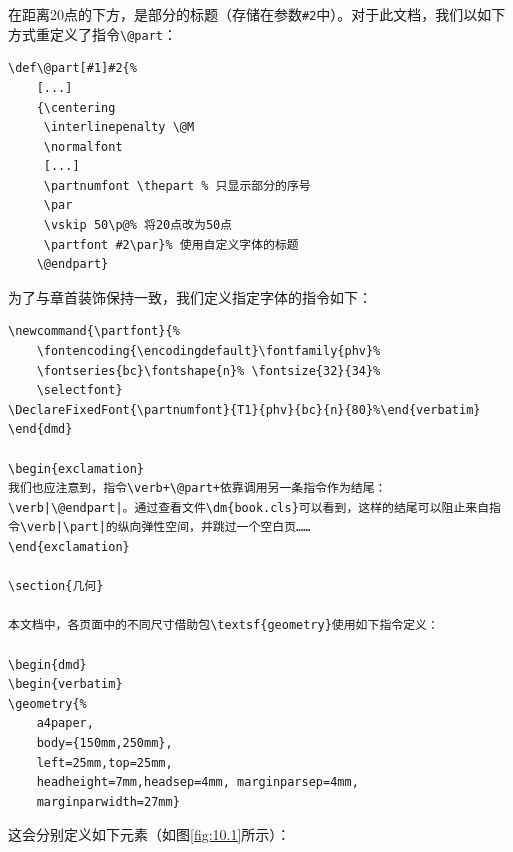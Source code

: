 在距离20点的下方，是部分的标题（存储在参数\verb|#2|中）。对于此文档，我们以如下方式重定义了指令\verb|\@part|：

\begin{dmd}
\begin{verbatim}
\def\@part[#1]#2{% 
    [...]
    {\centering
     \interlinepenalty \@M
     \normalfont
     [...]
     \partnumfont \thepart % 只显示部分的序号
     \par
     \vskip 50\p@% 将20点改为50点
     \partfont #2\par}% 使用自定义字体的标题
    \@endpart}\end{verbatim}
\end{dmd}

为了与章首装饰保持一致，我们定义指定字体的指令如下：

\begin{dmd}
\begin{verbatim}
\newcommand{\partfont}{% 
    \fontencoding{\encodingdefault}\fontfamily{phv}% 
    \fontseries{bc}\fontshape{n}% \fontsize{32}{34}%
    \selectfont}
\DeclareFixedFont{\partnumfont}{T1}{phv}{bc}{n}{80}%\end{verbatim}
\end{dmd}

\begin{exclamation}
我们也应注意到，指令\verb+\@part+依靠调用另一条指令作为结尾：\verb|\@endpart|。通过查看文件\dm{book.cls}可以看到，这样的结尾可以阻止来自指令\verb|\part|的纵向弹性空间，并跳过一个空白页……
\end{exclamation}

\section{几何}

本文档中，各页面中的不同尺寸借助包\textsf{geometry}使用如下指令定义：

\begin{dmd}
\begin{verbatim}
\geometry{%
    a4paper, 
    body={150mm,250mm}, 
    left=25mm,top=25mm, 
    headheight=7mm,headsep=4mm, marginparsep=4mm, 
    marginparwidth=27mm}\end{verbatim}
\end{dmd}

这会分别定义如下元素（如图\ref{fig:10.1}所示）：


